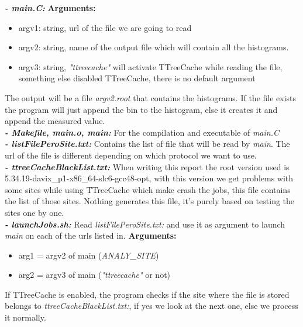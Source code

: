 \noindent \textbf{\textit{- main.C:}}
\textbf{Arguments:}\\
\begin{itemize}
	\item argv1: string, url of the file we are going to read
	\item argv2: string, name of the output file which will contain all the histograms.
	\item argv3: string, \textit{"ttreecache"} will activate TTreeCache while reading the file, something else disabled TTreeCache, there is no default argument
\end{itemize}

The output will be a file \textit{argv2.root} that contains the histograms. If the file exists the program will just append the bin to the histogram, else it creates it and append the measured value.\\

\noindent \textbf{\textit{- Makefile, main.o, main:}} For the compilation and executable of \textit{main.C}\\

\noindent \textbf{\textit{- listFilePeroSite.txt:}} Contains the list of file that will be read by \textit{main}. The url of the file is different depending on which protocol we want to use.\\
\noindent \textbf{\textit{- ttreeCacheBlackList.txt:}} When writing this report the root version used is 5.34.19-davix\_p1-x86\_64-slc6-gcc48-opt, with this version we get problems with some sites while using TTreeCache which make crash the jobs, this file contains the list of those sites. Nothing generates this file, it's purely based on testing the sites one by one.\\

\noindent \textbf{\textit{- launchJobs.sh:}} Read \textit{listFilePeroSite.txt:} and use it as argument to launch \textit{main} on each of the urls listed in.
\textbf{Arguments:}\\
\begin{itemize}
	\item arg1 = argv2 of main (\textit{ANALY\_SITE})
	\item arg2 = argv3 of main (\textit{"ttreecache"} or not)
\end{itemize}

If TTreeCache is enabled, the program checks if the site where the file is stored belongs to \textit{ttreeCacheBlackList.txt:}, if yes we look at the next one, else we process it normally.\\

